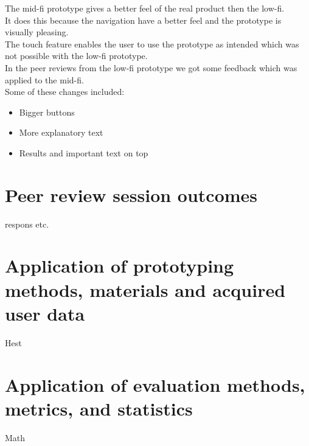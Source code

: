 The mid-fi prototype gives a better feel of the real product then the low-fi.\\
It does this because the navigation have a better feel and the prototype is visually pleasing.\\
The touch feature enables the user to use the prototype as intended which was not possible with the low-fi prototype.\\
In the peer reviews from the low-fi prototype we got some feedback which was applied to the mid-fi.\\
Some of these changes included:\\
\begin{itemize}
\item Bigger buttons
\item More explanatory text
\item Results and important text on top
\end{itemize}

\section{Peer review session outcomes}
respons etc.

\section{Application of prototyping methods, materials and acquired user data}
Hest

\section{Application of evaluation methods, metrics, and statistics}
Math